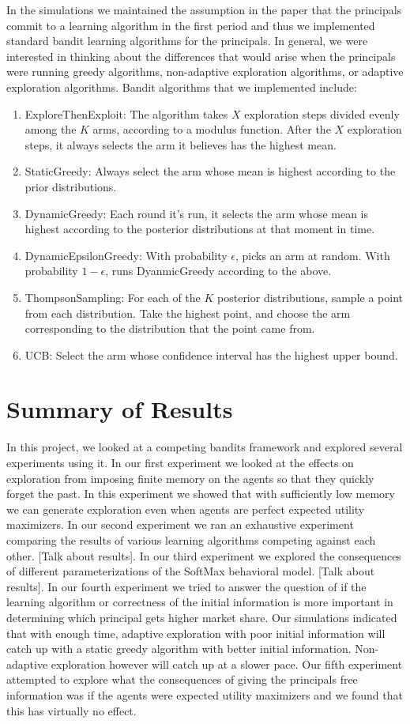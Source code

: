 \documentclass[11pt,letterpaper]{article}
\begin{document}
In the simulations we maintained the assumption in the paper that the principals commit to a learning algorithm in the first period and thus we implemented standard bandit learning algorithms for the principals. In general, we were interested in thinking about the differences that would arise when the principals were running greedy algorithms, non-adaptive exploration algorithms, or adaptive exploration algorithms. Bandit algorithms that we implemented include:
\begin{enumerate}
\item ExploreThenExploit: The algorithm takes $X$ exploration steps divided evenly among the $K$ arms, according to a modulus function. After the $X$ exploration steps, it always selects the arm it believes has the highest mean.
\item StaticGreedy: Always select the arm whose mean is highest according to the prior distributions.
\item DynamicGreedy: Each round it's run, it selects the arm whose mean is highest according to the posterior distributions at that moment in time.
\item DynamicEpsilonGreedy: With probability $\epsilon$, picks an arm at random. With probability $1-\epsilon$, runs DyanmicGreedy according to the above. 
\item ThompsonSampling: For each of the $K$ posterior distributions, sample a point from each distribution. Take the highest point, and choose the arm corresponding to the distribution that the point came from.
\item UCB: Select the arm whose confidence interval has the highest upper bound. 
\end{enumerate}

\section*{Summary of Results}
In this project, we looked at a competing bandits framework and explored several experiments using it. In our first experiment we looked at the effects on exploration from imposing finite memory on the agents so that they quickly forget the past. In this experiment we showed that with sufficiently low memory we can generate exploration even when agents are perfect expected utility maximizers. In our second experiment we ran an exhaustive experiment comparing the results of various learning algorithms competing against each other. [Talk about results]. In our third experiment we explored the consequences of different parameterizations of the SoftMax behavioral model. [Talk about results]. In our fourth experiment we tried to answer the question of if the learning algorithm or correctness of the initial information is more important in determining which principal gets higher market share. Our simulations indicated that with enough time, adaptive exploration with poor initial information will catch up with a static greedy algorithm with better initial information. Non-adaptive exploration however will catch up at a slower pace. Our fifth experiment attempted to explore what the consequences of giving the principals free information was if the agents were expected utility maximizers and we found that this has virtually no effect.
\end{document}
